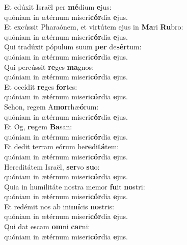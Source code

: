 \evenverse Et edúxit Israël per \textbf{mé}dium \textbf{e}jus:~\*\\
\evenverse quóniam in ætérnum miseri\textbf{cór}dia \textbf{e}jus.\\
\oddverse Et excússit Pharaónem, et virtútem ejus in \textbf{Ma}ri \textbf{Ru}bro:~\*\\
\oddverse quóniam in ætérnum miseri\textbf{cór}dia \textbf{e}jus.\\
\evenverse Qui tradúxit pópulum suum \textbf{per} de\textbf{sér}tum:~\*\\
\evenverse quóniam in ætérnum miseri\textbf{cór}dia \textbf{e}jus.\\
\oddverse Qui percússit \textbf{re}ges \textbf{ma}gnos:~\*\\
\oddverse quóniam in ætérnum miseri\textbf{cór}dia \textbf{e}jus.\\
\evenverse Et occídit \textbf{re}ges \textbf{for}tes:~\*\\
\evenverse quóniam in ætérnum miseri\textbf{cór}dia \textbf{e}jus.\\
\oddverse Sehon, regem A\textbf{mor}rhæ\textbf{ó}rum:~\*\\
\oddverse quóniam in ætérnum miseri\textbf{cór}dia \textbf{e}jus.\\
\evenverse Et Og, \textbf{re}gem \textbf{Ba}san:~\*\\
\evenverse quóniam in ætérnum miseri\textbf{cór}dia \textbf{e}jus.\\
\oddverse Et dedit terram eórum he\textbf{re}di\textbf{tá}tem:~\*\\
\oddverse quóniam in ætérnum miseri\textbf{cór}dia \textbf{e}jus.\\
\evenverse Hereditátem Israël, \textbf{ser}vo \textbf{su}o:~\*\\
\evenverse quóniam in ætérnum miseri\textbf{cór}dia \textbf{e}jus.\\
\oddverse Quia in humilitáte nostra memor \textbf{fu}it \textbf{no}stri:~\*\\
\oddverse quóniam in ætérnum miseri\textbf{cór}dia \textbf{e}jus.\\
\evenverse Et redémit nos ab ini\textbf{mí}cis \textbf{no}stris:~\*\\
\evenverse quóniam in ætérnum miseri\textbf{cór}dia \textbf{e}jus.\\
\oddverse Qui dat escam \textbf{om}ni \textbf{car}ni:~\*\\
\oddverse quóniam in ætérnum miseri\textbf{cór}dia \textbf{e}jus.\\
